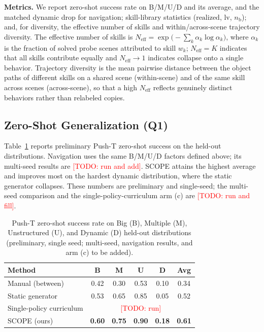 \documentclass[conference]{IEEEtran}
\newcommand{\realized}{\mathrm{realized}}
\newcommand{\lv}{\mathrm{lv}}
\newcommand{\bcount}{n_{\mathrm{b}}}
\newcommand{\todo}[1]{\textcolor{red}{[TODO: #1]}}
\begin{document}
\textbf{Metrics.} We report zero-shot success rate on B/M/U/D and its average,
and the matched dynamic drop for navigation;
skill-library statistics ($\realized$, $\lv$, $\bcount$); and, for diversity, the
effective number of skills and within/across-scene trajectory diversity. The
effective number of skills is
$N_{\mathrm{eff}}\!=\!\exp\!\big(-\sum_k \alpha_k\log \alpha_k\big)$, where
$\alpha_k$ is the fraction of solved probe scenes attributed to skill $w_k$;
$N_{\mathrm{eff}}\!=\!K$ indicates that all skills contribute equally and
$N_{\mathrm{eff}}\!\to\!1$ indicates collapse onto a single behavior. Trajectory
diversity is the mean pairwise distance between the object paths of different
skills on a shared scene (within-scene) and of the same skill across scenes
(across-scene), so that a high $N_{\mathrm{eff}}$ reflects genuinely distinct
behaviors rather than relabeled copies.

\subsection{Zero-Shot Generalization (Q1)}
Table~\ref{tab:heldout} reports preliminary Push-T zero-shot success on the
held-out distributions. Navigation uses the same B/M/U/D factors defined above;
its multi-seed results are \todo{run and add}.
SCOPE attains the highest average and improves most on the hardest dynamic
distribution, where the static generator collapses. These numbers are preliminary
and single-seed; the multi-seed comparison and the single-policy-curriculum arm
(c) are \todo{run and fill}.

\begin{table}[t]
\caption{Push-T zero-shot success rate on Big (B), Multiple (M), Unstructured
(U), and Dynamic (D) held-out distributions (preliminary, single seed;
multi-seed, navigation results, and arm (c) to be added).}
\label{tab:heldout}
\centering
\begin{tabular}{lccccc}
\toprule
Method & B & M & U & D & Avg \\
\midrule
Manual (between)          & 0.42 & 0.30 & 0.53 & 0.10 & 0.34 \\
Static generator          & 0.53 & 0.65 & 0.85 & 0.05 & 0.52 \\
Single-policy curriculum  & \multicolumn{5}{c}{\todo{run}} \\
SCOPE (ours)              & \textbf{0.60} & \textbf{0.75} & \textbf{0.90} & \textbf{0.18} & \textbf{0.61} \\
\bottomrule
\end{tabular}
\end{table}
\end{document}
